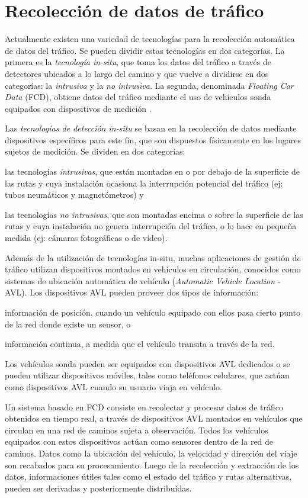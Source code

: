 \section{Recolección de datos de tráfico}
\label{sec:recoleccion_datos}

Actualmente existen una variedad de tecnologías para la recolección automática de datos del tráfico. Se pueden dividir estas tecnologías en dos categorías. La primera es la \emph{tecnología in-situ}, que toma los datos del tráfico a través de detectores ubicados a lo largo del camino y que vuelve a dividirse en dos categorías: la \emph{intrusiva} y la \emph{no intrusiva}. La segunda, denominada \emph{Floating Car Data} (FCD), obtiene datos del tráfico mediante el uso de vehículos sonda equipados con dispositivos de medición \cite{mimbela2003summary}.

Las \emph{tecnologías de detección in-situ} se basan en la recolección de datos mediante dispositivos específicos para este fin, que son dispuestos físicamente en los lugares sujetos de medición. Se dividen en dos categorías: \begin{enumerate*}[a)] \item las tecnologías \emph{intrusivas}, que están montadas en o por debajo de la superficie de las rutas y cuya instalación ocasiona la interrupción potencial del tráfico (ej: tubos neumáticos y magnetómetros) y \item las tecnologías \emph{no intrusivas}, que son montadas encima o sobre la superficie de las rutas y cuya instalación no genera interrupción del tráfico, o lo hace en pequeña medida (ej: cámaras fotográficas o de video).\end{enumerate*}

Además de la utilización de tecnologías in-situ, muchas aplicaciones de gestión de tráfico utilizan dispositivos montados en vehículos en circulación, conocidos como sistemas de ubicación automática de vehículo (\emph{Automatic Vehicle Location} - AVL). Los dispositivos AVL pueden proveer dos tipos de información: \begin{enumerate*}[a)]
\item información de posición, cuando un vehículo equipado con ellos pasa cierto punto de la red donde existe un sensor, o \item información continua, a medida que el vehículo transita a través de la red.
\end{enumerate*}
Los vehículos sonda pueden ser equipados con dispositivos AVL dedicados o se pueden utilizar dispositivos móviles, tales como teléfonos celulares, que actúan como dispositivos AVL cuando su usuario viaja en vehículo.  

Un sistema basado en FCD consiste en recolectar y procesar datos de tráfico obtenidos en tiempo real, a través de dispositivos AVL montados en vehículos que circulan en una red de caminos sujeta a observación. Todos los vehículos equipados con estos dispositivos actúan como sensores dentro de la red de caminos. Datos como la ubicación del vehículo, la velocidad y dirección del viaje son recabados para su procesamiento. Luego de la recolección y extracción de los datos, informaciones útiles tales como el estado del tráfico y rutas alternativas, pueden ser derivadas y posteriormente distribuidas.

